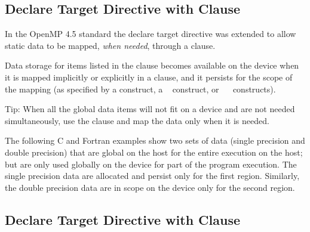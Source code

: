 \subsection{Declare Target Directive with  Clause}
\label{subsec:declare_target_link}




In the OpenMP 4.5 standard the declare target directive was extended to allow static
data to be mapped, \emph{when needed}, through a  clause.

Data storage for items listed in the  clause becomes available on the device
when it is mapped implicitly or explicitly in a  clause, and it persists for the scope of
the mapping (as specified by a  construct, 
a ~ construct, or 
~~ constructs).

Tip: When all the global data items will not fit on a device and are not needed
simultaneously, use the  clause and map the data only when it is needed.

The following C and Fortran examples show two sets of data (single precision and double precision)
that are global on the host for the entire execution on the host; but are only used
globally on the device for part of the program execution. The single precision data
are allocated and persist only for the first  region. Similarly, the
double precision data are in scope on the device only for the second  region.



\subsection{Declare Target Directive with  Clause}
\label{subsec:declare_target_device_type}


